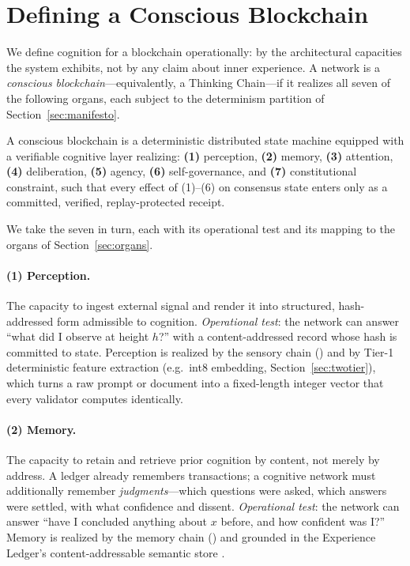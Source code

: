 \section{Defining a Conscious Blockchain}
\label{sec:defining}

We define cognition for a blockchain operationally: by the architectural capacities the system exhibits, not by any claim about inner experience. A network is a \emph{conscious blockchain}---equivalently, a Thinking Chain---if it realizes all seven of the following organs, each subject to the determinism partition of Section~\ref{sec:manifesto}.

\begin{definition}
\label{def:conscious}
A conscious blockchain is a deterministic distributed state machine equipped with a verifiable cognitive layer realizing: \textbf{(1)} perception, \textbf{(2)} memory, \textbf{(3)} attention, \textbf{(4)} deliberation, \textbf{(5)} agency, \textbf{(6)} self-governance, and \textbf{(7)} constitutional constraint, such that every effect of (1)--(6) on consensus state enters only as a committed, verified, replay-protected \PoT{} receipt.
\end{definition}

We take the seven in turn, each with its operational test and its mapping to the organs of Section~\ref{sec:organs}.

\paragraph{(1) Perception.} The capacity to ingest external signal and render it into structured, hash-addressed form admissible to cognition. \emph{Operational test}: the network can answer ``what did I observe at height $h$?'' with a content-addressed record whose hash is committed to state. Perception is realized by the sensory chain (\SChain{}) and by Tier-1 deterministic feature extraction (e.g.\ int8 embedding, Section~\ref{sec:twotier}), which turns a raw prompt or document into a fixed-length integer vector that every validator computes identically.

\paragraph{(2) Memory.} The capacity to retain and retrieve prior cognition by content, not merely by address. A ledger already remembers transactions; a cognitive network must additionally remember \emph{judgments}---which questions were asked, which answers were settled, with what confidence and dissent. \emph{Operational test}: the network can answer ``have I concluded anything about $x$ before, and how confident was I?'' Memory is realized by the memory chain (\MChain{}) and grounded in the Experience Ledger's content-addressable semantic store \cite{zoo-experience-ledger}.

